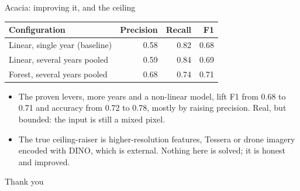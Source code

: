 \documentclass[aspectratio=169]{beamer}
\begin{document}
\begin{frame}{Acacia: improving it, and the ceiling}
\begin{center}
\begin{tabular}{lrrr}
\toprule
Configuration & Precision & Recall & F1 \\
\midrule
Linear, single year (baseline) & 0.58 & 0.82 & 0.68 \\
Linear, several years pooled & 0.59 & 0.84 & 0.69 \\
Forest, several years pooled & 0.68 & 0.74 & 0.71 \\
\bottomrule
\end{tabular}
\end{center}
\begin{itemize}\small
  \item The proven levers, more years and a non-linear model, lift F1 from 0.68 to 0.71 and accuracy from
  0.72 to 0.78, mostly by raising precision. Real, but bounded: the input is still a mixed pixel.
  \item The true ceiling-raiser is higher-resolution features, Tessera or drone imagery encoded with
  DINO, which is external. Nothing here is solved; it is honest and improved.
\end{itemize}
\end{frame}

\begin{frame}
\centering
\vspace{1.5cm}
{\Large Thank you}
\vspace{0.5cm}


\end{frame}
\end{document}
